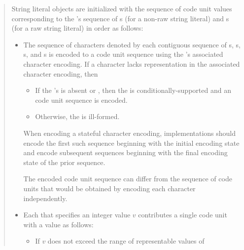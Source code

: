 \documentclass{wg21}
\begin{document}
\begin{quote}
    
String literal objects are initialized with
the sequence of code unit values
corresponding to the 's sequence of
s (for a non-raw string literal) and
s (for a raw string literal)
in order as follows:
\begin{itemize}
    \item
    The sequence of characters denoted by each contiguous sequence of
    s,
    s,
    s, and
    s
    is encoded to a code unit sequence
    using the 's associated character encoding.
    If a character lacks representation in the associated character encoding, then 
    \begin{removedblock}
    \begin{itemize}
        \item
        If the 's 
        is absent or ,
        then the  is conditionally-supported and
        an
        code unit sequence is encoded.
        \item
        Otherwise, the  is ill-formed.
    \end{itemize}
    \end{removedblock}
    When encoding a stateful character encoding,
    implementations should encode the first such sequence
    beginning with the initial encoding state and
    encode subsequent sequences
    beginning with the final encoding state of the prior sequence.
    \begin{note}
        The encoded code unit sequence can differ from
        the sequence of code units that would be obtained by
        encoding each character independently.
    \end{note}
    \item
    Each 
    that specifies an integer value $v$
    contributes a single code unit with a value as follows:
    \begin{itemize}
        \item
        If $v$ does not exceed the range of representable values of

\end{itemize}
\end{itemize}
\end{quote}
\end{document}

